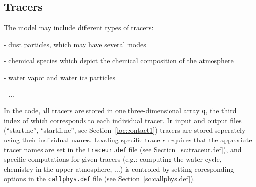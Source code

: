 \subsection{Tracers}
The model may include different types of tracers:
\begin{description}
\item - dust particles, which may have several modes
\item - chemical species which depict the chemical composition of the
atmosphere %
\item - water vapor and water ice particles %
\item - ...
\end{description} 


In the code, all tracers are stored in one three-dimensional array {\tt q},
the third index of which corresponds to each individual tracer.
In input and output files (``start.nc'', ``startfi.nc'',
see Section~\ref{loc:contact1}) tracers are stored seperately using their
individual names. Loading specific tracers requires that
the approriate tracer names are set in the {\tt traceur.def} file
(see Section~\ref{sc:traceur.def}), and specific computations
for given tracers (e.g.: computing the water cycle, chemistry in the
upper atmosphere, ...) is controled by setting coresponding options in the
{\tt callphys.def} file (see Section~\ref{sc:callphys.def}).
